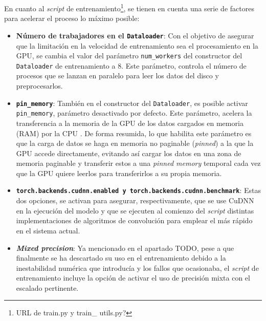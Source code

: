 En cuanto al \textit{script} de entrenamiento\footnote{URL de train.py y train\_ utils.py?}, se tienen en cuenta una serie de factores para acelerar el proceso lo máximo posible:
\begin{itemize}

\item \textbf{Número de trabajadores en el \texttt{Dataloader}}: Con el objetivo de asegurar que la limitación en la velocidad de entrenamiento sea el procesamiento en la GPU, se cambia el valor del parámetro \texttt{num\_workers} del constructor del \texttt{Dataloader} de entrenamiento a 8. Este parámetro, controla el número de procesos que se lanzan en paralelo para leer los datos del disco y preprocesarlos.

\item \textbf{\texttt{pin\_memory}}: También en el constructor del \texttt{Dataloader}, es posible activar \texttt{pin\_memory}, parámetro desactivado por defecto. Este parámetro, acelera la transferencia a la memoria de la GPU de los datos cargados en memoria (RAM) por la CPU \cite{harris2012}. De forma resumida, lo que habilita este parámetro es que la carga de datos se haga en memoria no paginable (\textit{pinned}) a la que la GPU accede directamente, evitando así cargar los datos en una zona de memoria paginable y transferir estos a una \textit{pinned memory} temporal cada vez que la GPU quiere leerlos para transferirlos a su propia memoria.

\item \textbf{\texttt{torch.backends.cudnn.enabled y \texttt{torch.backends.cudnn.benchmark}}}: Estas dos opciones, se activan para asegurar, respectivamente, que se use CuDNN en la ejecución del modelo y que se ejecuten al comienzo del \textit{script} distintas implementaciones de algoritmos de convolución para emplear el más rápido en el sistema actual.

\item \textbf{\textit{Mixed precision}}: Ya mencionado en el apartado TODO, pese a que finalmente se ha descartado su uso en el entrenamiento debido a la inestabilidad numérica que introducía y los fallos que ocasionaba, el \textit{script} de entrenamiento incluye la opción de activar el uso de precisión mixta con el escalado pertinente.
\end{itemize}


